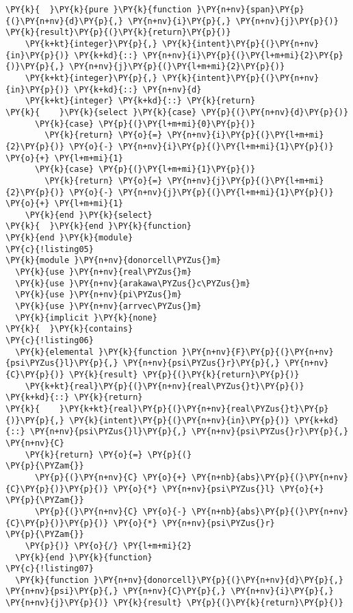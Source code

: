 \begin{Verbatim}[commandchars=\\\{\}]
\PY{k}{  }\PY{k}{pure }\PY{k}{function }\PY{n+nv}{span}\PY{p}{(}\PY{n+nv}{d}\PY{p}{,} \PY{n+nv}{i}\PY{p}{,} \PY{n+nv}{j}\PY{p}{)} \PY{k}{result}\PY{p}{(}\PY{k}{return}\PY{p}{)}
    \PY{k+kt}{integer}\PY{p}{,} \PY{k}{intent}\PY{p}{(}\PY{n+nv}{in}\PY{p}{)} \PY{k+kd}{::} \PY{n+nv}{i}\PY{p}{(}\PY{l+m+mi}{2}\PY{p}{)}\PY{p}{,} \PY{n+nv}{j}\PY{p}{(}\PY{l+m+mi}{2}\PY{p}{)}
    \PY{k+kt}{integer}\PY{p}{,} \PY{k}{intent}\PY{p}{(}\PY{n+nv}{in}\PY{p}{)} \PY{k+kd}{::} \PY{n+nv}{d}
    \PY{k+kt}{integer} \PY{k+kd}{::} \PY{k}{return}
\PY{k}{    }\PY{k}{select }\PY{k}{case} \PY{p}{(}\PY{n+nv}{d}\PY{p}{)}
      \PY{k}{case} \PY{p}{(}\PY{l+m+mi}{0}\PY{p}{)}
        \PY{k}{return} \PY{o}{=} \PY{n+nv}{i}\PY{p}{(}\PY{l+m+mi}{2}\PY{p}{)} \PY{o}{-} \PY{n+nv}{i}\PY{p}{(}\PY{l+m+mi}{1}\PY{p}{)} \PY{o}{+} \PY{l+m+mi}{1}
      \PY{k}{case} \PY{p}{(}\PY{l+m+mi}{1}\PY{p}{)}
        \PY{k}{return} \PY{o}{=} \PY{n+nv}{j}\PY{p}{(}\PY{l+m+mi}{2}\PY{p}{)} \PY{o}{-} \PY{n+nv}{j}\PY{p}{(}\PY{l+m+mi}{1}\PY{p}{)} \PY{o}{+} \PY{l+m+mi}{1}
    \PY{k}{end }\PY{k}{select}
\PY{k}{  }\PY{k}{end }\PY{k}{function}
\PY{k}{end }\PY{k}{module}
\PY{c}{!listing05}
\PY{k}{module }\PY{n+nv}{donorcell\PYZus{}m}
  \PY{k}{use }\PY{n+nv}{real\PYZus{}m}
  \PY{k}{use }\PY{n+nv}{arakawa\PYZus{}c\PYZus{}m}
  \PY{k}{use }\PY{n+nv}{pi\PYZus{}m}
  \PY{k}{use }\PY{n+nv}{arrvec\PYZus{}m}
  \PY{k}{implicit }\PY{k}{none}
\PY{k}{  }\PY{k}{contains} 
\PY{c}{!listing06}
  \PY{k}{elemental }\PY{k}{function }\PY{n+nv}{F}\PY{p}{(}\PY{n+nv}{psi\PYZus{}l}\PY{p}{,} \PY{n+nv}{psi\PYZus{}r}\PY{p}{,} \PY{n+nv}{C}\PY{p}{)} \PY{k}{result} \PY{p}{(}\PY{k}{return}\PY{p}{)}
    \PY{k+kt}{real}\PY{p}{(}\PY{n+nv}{real\PYZus{}t}\PY{p}{)} \PY{k+kd}{::} \PY{k}{return}
\PY{k}{    }\PY{k+kt}{real}\PY{p}{(}\PY{n+nv}{real\PYZus{}t}\PY{p}{)}\PY{p}{,} \PY{k}{intent}\PY{p}{(}\PY{n+nv}{in}\PY{p}{)} \PY{k+kd}{::} \PY{n+nv}{psi\PYZus{}l}\PY{p}{,} \PY{n+nv}{psi\PYZus{}r}\PY{p}{,} \PY{n+nv}{C}
    \PY{k}{return} \PY{o}{=} \PY{p}{(}                                         \PY{p}{\PYZam{}}
      \PY{p}{(}\PY{n+nv}{C} \PY{o}{+} \PY{n+nb}{abs}\PY{p}{(}\PY{n+nv}{C}\PY{p}{)}\PY{p}{)} \PY{o}{*} \PY{n+nv}{psi\PYZus{}l} \PY{o}{+}                           \PY{p}{\PYZam{}}
      \PY{p}{(}\PY{n+nv}{C} \PY{o}{-} \PY{n+nb}{abs}\PY{p}{(}\PY{n+nv}{C}\PY{p}{)}\PY{p}{)} \PY{o}{*} \PY{n+nv}{psi\PYZus{}r}                             \PY{p}{\PYZam{}}
    \PY{p}{)} \PY{o}{/} \PY{l+m+mi}{2}
  \PY{k}{end }\PY{k}{function}
\PY{c}{!listing07}
  \PY{k}{function }\PY{n+nv}{donorcell}\PY{p}{(}\PY{n+nv}{d}\PY{p}{,} \PY{n+nv}{psi}\PY{p}{,} \PY{n+nv}{C}\PY{p}{,} \PY{n+nv}{i}\PY{p}{,} \PY{n+nv}{j}\PY{p}{)} \PY{k}{result} \PY{p}{(}\PY{k}{return}\PY{p}{)}

\end{Verbatim}
